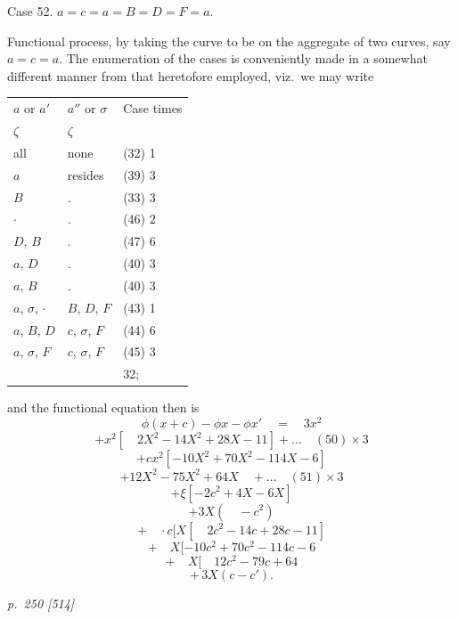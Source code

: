 \documentclass[11pt,a4paper]{book}
\begin{document}
Case 52.  $a = c = a = B = D = F = a$.

Functional process, by taking the curve to be on the aggregate of two curves, say
$a = c = a$.  The enumeration of the cases is conveniently made in a somewhat different
manner from that heretofore employed, viz.\ we may write

\begin{center}
\begin{tabular}{lll}
$a$ or $a'$ & $a''$ or $\sigma$ & Case \quad times \\
$\zeta$ & $\zeta$ &  \\
\hline
all  & none  & (32)  1 \\
$a$ & resides & (39)  3 \\
$B$ & . & (33)  3 \\
$\cdot$ & . & (46)  2 \\
$D$, $B$ & . & (47)  6 \\
$a$, $D$ & . & (40)  3 \\
$a$, $B$ & . & (40)  3 \\
$a$, $\sigma$, $\cdot$ & $B$, $D$, $F$ & (43)  1 \\
$a$, $B$, $D$ & $c$, $\sigma$, $F$ & (44)  6 \\
$a$, $\sigma$, $F$ & $c$, $\sigma$, $F$ & (45)  3 \\
\hline
& & 32; \\
\end{tabular}
\end{center}

and the functional equation then is
\[
\phi(x + c) - \phi x - \phi x' \quad = \quad 3x^2
\]
\[
+ x^2[\quad 2X^2 - 14X^2 + 28X - 11] + \ldots \quad (50) \times 3
\]
\[
+ c x^2 [-10X^2 + 70X^2 - 114X - 6]
\]
\[
+ 12X^2 - 75X^2 + 64X \quad + \ldots \quad (51) \times 3
\]
\[
+ \xi [-2c^2 + 4X - 6X]
\]
\[
+ 3X(\quad - c^2)
\]
\[
+ \quad \cdot c[X[ \quad 2c^2 - 14c + 28c - 11 ]
\]
\[
+ \quad X[ -10c^2 + 70c^2 - 114c - 6
\]
\[
+ \quad X[ \quad 12c^2 - 79c + 64
\]
\[
+ \,3X(c - c').
\]

\clearpage

\bigskip
\textit{p.~250 [514]}
\smallskip
\end{document}

